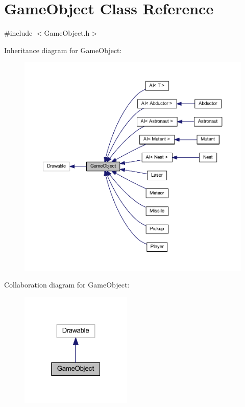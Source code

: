 \hypertarget{class_game_object}{}\section{Game\+Object Class Reference}
\label{class_game_object}


{\ttfamily \#include $<$Game\+Object.\+h$>$}



Inheritance diagram for Game\+Object\+:\nopagebreak
\begin{figure}[H]
\begin{center}
\leavevmode
\includegraphics[width=350pt]{class_game_object__inherit__graph}
\end{center}
\end{figure}


Collaboration diagram for Game\+Object\+:\nopagebreak
\begin{figure}[H]
\begin{center}
\leavevmode
\includegraphics[width=151pt]{class_game_object__coll__graph}
\end{center}
\end{figure}
